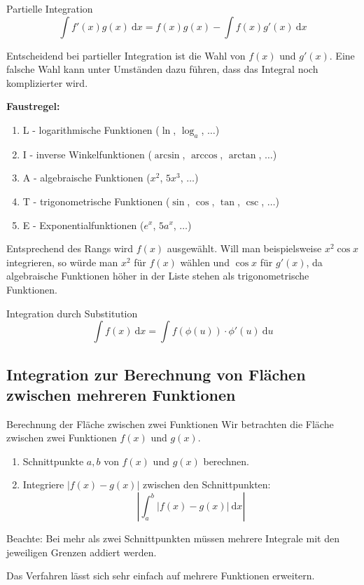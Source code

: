 \documentclass[german]{spicker}
\renewcommand{\abs}[1]{\left| #1 \right|}
\newcommand{\dx}{~\mathrm{d}x}
\newcommand{\du}{~\mathrm{d}u}
\begin{document}
\begin{bonus}{Partielle Integration}
    $$
        \int f'(x)g(x) \dx = f(x)g(x) - \int f(x) g'(x) \dx
    $$

    Entscheidend bei partieller Integration ist die Wahl von $f(x)$ und $g'(x)$.
    Eine falsche Wahl kann unter Umständen dazu führen, dass das Integral noch komplizierter wird.

    \textbf{Faustregel:}
    \begin{enumerate}
        \item L - logarithmische Funktionen ($\ln$, $\log_a$, $\ldots$)
        \item I - inverse Winkelfunktionen ($\arcsin$, $\arccos$, $\arctan$, $\ldots$)
        \item A - algebraische Funktionen ($x^2$, $5x^3$, $\ldots$)
        \item T - trigonometrische Funktionen ($\sin$, $\cos$, $\tan$, $\csc$, $\ldots$)
        \item E - Exponentialfunktionen ($e^x$, $5a^x$, $\ldots$)
    \end{enumerate}
    Entsprechend des Rangs wird $f(x)$ ausgewählt. Will man beispielsweise $x^2\cos x$ integrieren, so würde man $x^2$ für $f(x)$ wählen und $\cos x$ für $g'(x)$, da algebraische Funktionen höher in der Liste stehen als trigonometrische Funktionen.
\end{bonus}

\begin{bonus}{Integration durch Substitution}
    $$
        \int f(x)\dx = \int f(\phi(u)) \cdot \phi'(u) \du
    $$
\end{bonus}

\subsection{Integration zur Berechnung von Flächen zwischen mehreren Funktionen}

\begin{algo}{Berechnung der Fläche zwischen zwei Funktionen}
    Wir betrachten die Fläche zwischen zwei Funktionen $f(x)$ und $g(x)$.

    \begin{enumerate}
        \item Schnittpunkte $a, b$ von $f(x)$ und $g(x)$ berechnen.
        \item Integriere $\abs{f(x) - g(x)}$ zwischen den Schnittpunkten:
              $$
                  \abs{\int^b_a\abs{f(x) -g(x)} \dx}
              $$
    \end{enumerate}

    Beachte: Bei mehr als zwei Schnittpunkten müssen mehrere Integrale mit den jeweiligen Grenzen addiert werden.

    Das Verfahren lässt sich sehr einfach auf mehrere Funktionen erweitern.
\end{algo}
\end{document}
